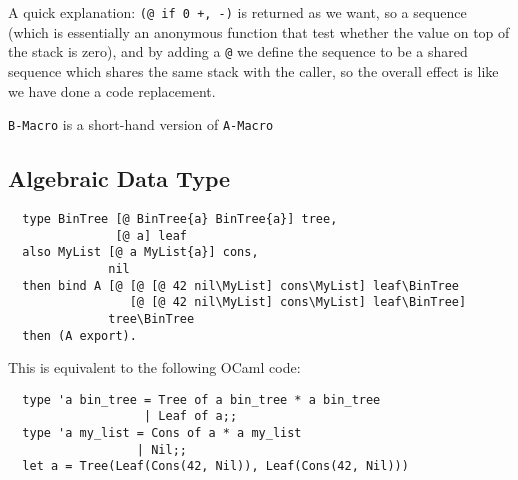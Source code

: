 \documentclass{book}
\begin{document}
A quick explanation: \texttt{(@ if~0 +, -)} is returned as we want, so a sequence (which is essentially an anonymous function that test whether the value on top of the stack is zero), and by adding a \texttt{@} we define the sequence to be a shared sequence which shares the same stack with the caller, so the overall effect is like we have done a code replacement.

\texttt{B-Macro} is a short-hand version of \texttt{A-Macro}

\subsection{Algebraic Data Type}
\begin{verbatim}
  type BinTree [@ BinTree{a} BinTree{a}] tree,
               [@ a] leaf
  also MyList [@ a MyList{a}] cons,
              nil
  then bind A [@ [@ [@ 42 nil\MyList] cons\MyList] leaf\BinTree
                 [@ [@ 42 nil\MyList] cons\MyList] leaf\BinTree]
              tree\BinTree
  then (A export).
\end{verbatim}

This is equivalent to the following OCaml code:
\begin{verbatim}
  type 'a bin_tree = Tree of a bin_tree * a bin_tree
                   | Leaf of a;;
  type 'a my_list = Cons of a * a my_list
                  | Nil;;
  let a = Tree(Leaf(Cons(42, Nil)), Leaf(Cons(42, Nil)))
\end{verbatim}
\end{document}
